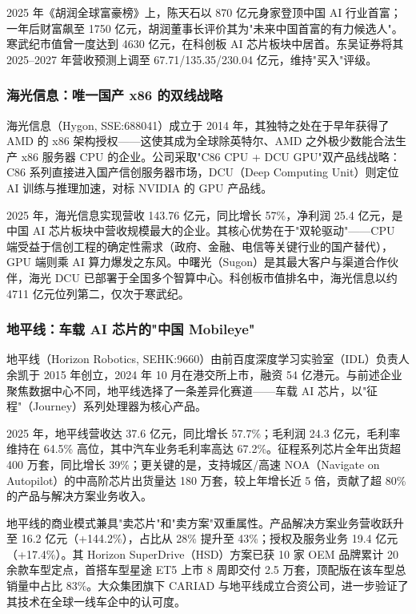 2025 年《胡润全球富豪榜》上，陈天石以 870 亿元身家登顶中国 AI 行业首富；一年后财富飙至 1750 亿元，胡润董事长评价其为"未来中国首富的有力候选人"。寒武纪市值曾一度达到 4630 亿元，在科创板 AI 芯片板块中居首。东吴证券将其 2025--2027 年营收预测上调至 67.71/135.35/230.04 亿元，维持"买入"评级。

\subsubsection{海光信息：唯一国产 x86 的双线战略}

海光信息（Hygon, SSE:688041）成立于 2014 年，其独特之处在于早年获得了 AMD 的 x86 架构授权——这使其成为全球除英特尔、AMD 之外极少数能合法生产 x86 服务器 CPU 的企业。公司采取"C86 CPU + DCU GPU"双产品线战略：C86 系列直接进入国产信创服务器市场，DCU（Deep Computing Unit）则定位 AI 训练与推理加速，对标 NVIDIA 的 GPU 产品线。

2025 年，海光信息实现营收 143.76 亿元，同比增长 57\%，净利润 25.4 亿元，是中国 AI 芯片板块中营收规模最大的企业。其核心优势在于"双轮驱动"——CPU 端受益于信创工程的确定性需求（政府、金融、电信等关键行业的国产替代），GPU 端则乘 AI 算力爆发之东风。中曙光（Sugon）是其最大客户与渠道合作伙伴，海光 DCU 已部署于全国多个智算中心。科创板市值排名中，海光信息以约 4711 亿元位列第二，仅次于寒武纪。

\subsubsection{地平线：车载 AI 芯片的"中国 Mobileye"}

地平线（Horizon Robotics, SEHK:9660）由前百度深度学习实验室（IDL）负责人余凯于 2015 年创立，2024 年 10 月在港交所上市，融资 54 亿港元。与前述企业聚焦数据中心不同，地平线选择了一条差异化赛道——车载 AI 芯片，以"征程"（Journey）系列处理器为核心产品。

2025 年，地平线营收达 37.6 亿元，同比增长 57.7\%；毛利润 24.3 亿元，毛利率维持在 64.5\% 高位，其中汽车业务毛利率高达 67.2\%。征程系列芯片全年出货超 400 万套，同比增长 39\%；更关键的是，支持城区/高速 NOA（Navigate on Autopilot）的中高阶芯片出货量达 180 万套，较上年增长近 5 倍，贡献了超 80\% 的产品与解决方案业务收入。

地平线的商业模式兼具"卖芯片"和"卖方案"双重属性。产品解决方案业务营收跃升至 16.2 亿元（+144.2\%），占比从 28\% 提升至 43\%；授权及服务业务 19.4 亿元（+17.4\%）。其 Horizon SuperDrive（HSD）方案已获 10 家 OEM 品牌累计 20 余款车型定点，首搭车型星途 ET5 上市 8 周即交付 2.5 万套，顶配版在该车型总销量中占比 83\%。大众集团旗下 CARIAD 与地平线成立合资公司，进一步验证了其技术在全球一线车企中的认可度。


